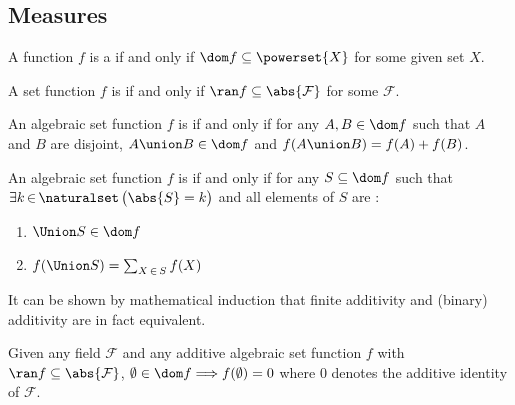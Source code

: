 \subsection{Measures}
\begin{dfn}
     \label{dfn:set-function}
    A function \( f \) is a  if and only if \( \dom f \subseteq \powerset{X} \) for some given set \( X \).
\end{dfn}

\begin{dfn}
    A set function \( f \) is  if and only if \( \ran f \subseteq \abs{\mathcal{F}} \) for some  \( \mathcal{F} \).
\end{dfn}

\begin{dfn}[Additivity]
     \label{dfn:additive-set-function}
    An algebraic set function \( f \) is  if and only if for any \( A, B \in \dom f \) such that \( A \) and \( B \)
    are disjoint, \( A \union B \in \dom f \) and \( f(A \union B) = f(A) + f(B) \).
\end{dfn}

\begin{dfn}
     \label{dfn:finite-additive-set-function}
    An algebraic set function \( f \) is  if and only if for any \( S \subseteq \dom f \)
    such that \( \exists k\,{\in}\,\naturalset \, \big( \abs{S} = k \big) \) and all elements of \( S \)
    are :
    \begin{enumerate}[topsep=2pt,label=\textup{\texttt{(\alph*)}}]
        \item \( \Union S \in \dom f \)
        \item \( f \mleft( \Union S \mright) = \sum_{X \,\in\, S} f(X) \)
    \end{enumerate}
\end{dfn}

\begin{rem}
    It can be shown by mathematical induction that finite additivity and (binary) additivity are in fact equivalent.
\end{rem}

\begin{thm}
     \label{thm:additive-set-function-maps-empty-set-to-0}
    Given any field \( \mathcal{F} \) and any additive algebraic set function \( f \) with \( \ran f \subseteq \abs{\mathcal{F}} \),
    \( \emptyset \in \dom f {\implies} f(\emptyset) = 0 \) where \( 0 \) denotes the additive identity of \( \mathcal{F} \).
\end{thm}

